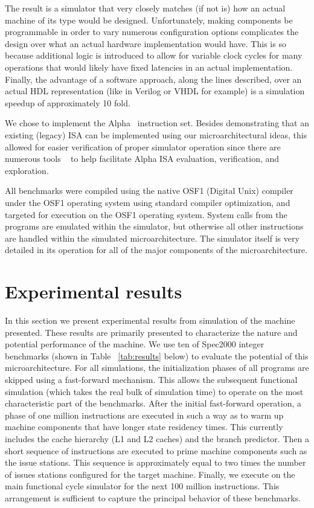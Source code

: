 \documentclass[10pt,dvips]{article}
\begin{document}
The result is a simulator that very closely matches (if
not is) how
an actual machine of its type would be designed.
Unfortunately, making components be programmable in order to
vary numerous configuration options complicates the design
over what an actual hardware implementation would have.
This is so because additional logic is introduced to allow
for variable clock cycles for many operations that would likely
have fixed latencies in an actual implementation.
Finally, the advantage of a software approach, along the
lines described, over an actual HDL representation (like in Verilog or
VHDL for example) is a simulation speedup of approximately 10 fold.

We chose to implement the Alpha~\cite{Bannon95} instruction set.
Besides demonstrating that an existing (legacy) ISA can be
implemented using our microarchitectural ideas,
this allowed for easier verification of proper
simulator operation since there are numerous 
tools ~\cite{srivastava94b,eustace94c}
to help
facilitate Alpha ISA evaluation, verification, and exploration.

All benchmarks were compiled using the native OSF1 (Digital Unix)
compiler under the OSF1 operating system 
using standard compiler optimization,
and targeted for execution on the OSF1 operating system.
System calls from the programs are emulated within the simulator,
but otherwise all other instructions are handled
within the simulated microarchitecture.
The simulator itself is very detailed in its operation for
all of the major components of the microarchitecture.
%
%
\vspace{-0.15in}
\section{Experimental results}
%
In this section we present experimental results from simulation
of the machine presented.
These results are primarily presented to characterize the
nature and potential performance of the machine.
We use ten of Spec2000 integer benchmarks 
(shown in Table ~\ref{tab:results} below) to evaluate the potential
of this microarchitecture. 
For all simulations, the initialization phases of all
programs are skipped using a fast-forward mechanism.
This allows the subsequent functional simulation (which takes
the real bulk of simulation time) to operate on the most
characteristic part of the benchmarks.
After the initial fast-forward operation, a phase of one million 
instructions are executed in such
a way as to warm up machine components that have longer
state residency times.  This currently includes the cache hierarchy
(L1 and L2 caches) and the branch predictor.
Then a short sequence of instructions are 
executed to prime machine components such as the issue stations.
This sequence is approximately equal to two times the number
of issues stations configured for the target machine.
Finally, we execute on the main functional cycle simulator
for the next 100 million instructions.  
This arrangement is sufficient
to capture the principal behavior of these 
benchmarks.~\cite{sherwood02}
\end{document}
